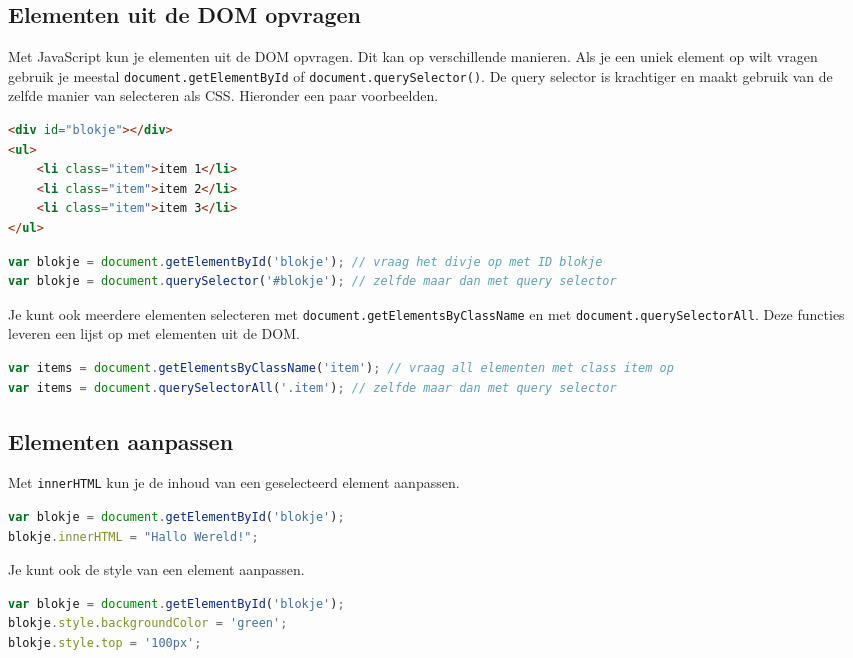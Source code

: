 \documentclass[8pt,pagesize,footinclude=false,headinclude=false]{scrartcl}
\begin{document}
\begin{multicols*}{3}
\subsection*{Elementen uit de DOM opvragen}
Met JavaScript kun je elementen uit de DOM opvragen. Dit kan op verschillende manieren. Als je een uniek element op wilt vragen gebruik je meestal \texttt{document.getElementById} of \texttt{document.querySelector()}. De query selector is krachtiger en maakt gebruik van de zelfde manier van selecteren als CSS. Hieronder een paar voorbeelden.

\begin{lstlisting}[language=HTML]
<div id="blokje"></div>
<ul>
	<li class="item">item 1</li>
	<li class="item">item 2</li>
	<li class="item">item 3</li>
</ul>
\end{lstlisting}

\begin{lstlisting}[language=javascript]
var blokje = document.getElementById('blokje'); // vraag het divje op met ID blokje
var blokje = document.querySelector('#blokje'); // zelfde maar dan met query selector
\end{lstlisting}

\noindent Je kunt ook meerdere elementen selecteren met \texttt{document.getElementsByClassName} en met \texttt{document.querySelectorAll}. Deze functies leveren een lijst op met elementen uit de DOM.

\begin{lstlisting}[language=javascript]
var items = document.getElementsByClassName('item'); // vraag all elementen met class item op
var items = document.querySelectorAll('.item'); // zelfde maar dan met query selector
\end{lstlisting}

\subsection*{Elementen aanpassen}
Met \texttt{innerHTML} kun je de inhoud van een geselecteerd element aanpassen.
\begin{lstlisting}[language=javascript]
var blokje = document.getElementById('blokje');
blokje.innerHTML = "Hallo Wereld!";
\end{lstlisting}
\noindent Je kunt ook de style van een element aanpassen.
\begin{lstlisting}[language=javascript]
var blokje = document.getElementById('blokje');
blokje.style.backgroundColor = 'green';
blokje.style.top = '100px';
\end{lstlisting}


\end{multicols*}
\end{document}
